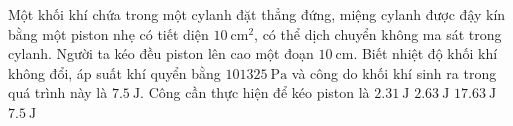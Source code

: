 \begin{ex}
Một khối khí chứa trong một cylanh đặt thẳng đứng, miệng cylanh được đậy kín bằng một piston nhẹ có tiết diện $\SI{10}{\centi\meter^2}$, có thể dịch chuyển không ma sát trong cylanh. Người ta kéo đều piston lên cao một đoạn $\SI{10}{\centi\meter}$. Biết nhiệt độ khối khí không đổi, áp suất khí quyển bằng $\SI{101325}{\pascal}$ và công do khối khí sinh ra trong quá trình này là $\SI{7.5}{\joule}$. Công cần thực hiện để kéo piston là
	\choice
	{$\SI{2.31}{\joule}$}
	{\True $\SI{2.63}{\joule}$}
	{$\SI{17.63}{\joule}$}
	{$\SI{7.5}{\joule}$}
\end{ex}
